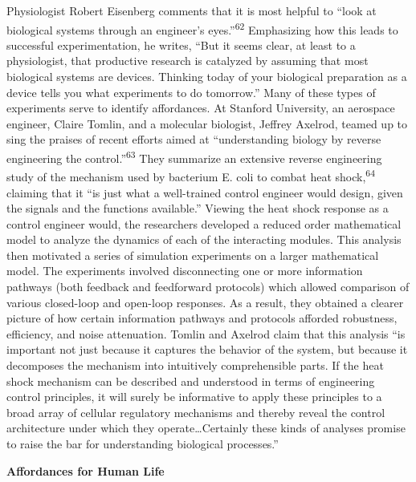 Physiologist Robert Eisenberg comments that it is most helpful to “look
at biological systems through an engineer’s eyes.”\textsuperscript{62}
Emphasizing how this leads to successful experimentation, he writes,
“But it seems clear, at least to a physiologist, that productive
research is catalyzed by assuming that most biological systems are
devices. Thinking today of your biological preparation as a device
tells you what experiments to do tomorrow.” Many of these types of
experiments serve to identify affordances. At Stanford University, an
aerospace engineer, Claire Tomlin, and a molecular biologist, Jeffrey
Axelrod, teamed up to sing the praises of recent efforts aimed at
“understanding biology by reverse engineering the
control.”\textsuperscript{63} They summarize an extensive reverse
engineering study of the mechanism used by bacterium E. coli to combat
heat shock,\textsuperscript{64} claiming that it “is just what a
well-trained control engineer would design, given the signals and the
functions available.” Viewing the heat shock response as a control
engineer would, the researchers developed a reduced order mathematical
model to analyze the dynamics of each of the interacting modules. This
analysis then motivated a series of simulation experiments on a larger
mathematical model. The experiments involved disconnecting one or more
information pathways (both feedback and feedforward protocols) which
allowed comparison of various closed-loop and open-loop responses. As a
result, they obtained a clearer picture of how certain information
pathways and protocols afforded robustness, efficiency, and noise
attenuation. Tomlin and Axelrod claim that this analysis “is important
not just because it captures the behavior of the system, but because it
decomposes the mechanism into intuitively comprehensible parts. If the
heat shock mechanism can be described and understood in terms of
engineering control principles, it will surely be informative to apply
these principles to a broad array of cellular regulatory mechanisms and
thereby reveal the control architecture under which they
operate…Certainly these kinds of analyses promise to raise the bar for
understanding biological processes.”


\bigskip


\textbf{Affordances for Human Life}


